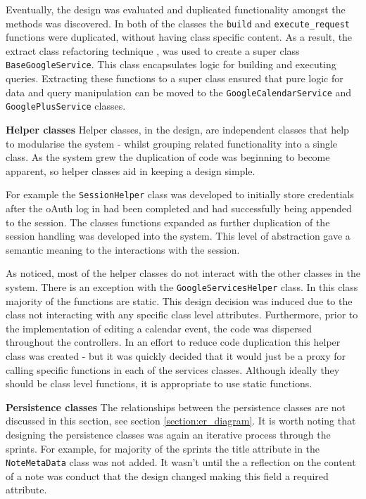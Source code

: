 Eventually, the design was evaluated and duplicated functionality amongst the methods was discovered. In both of the classes the \texttt{build} and \texttt{execute\_request} functions were duplicated, without having class specific content. As a result, the extract class refactoring technique \cite{citeulike:14023810}, was used to create a super class \texttt{BaseGoogleService}. This class encapsulates logic for building  and executing queries. Extracting these functions to a super class ensured that pure logic for data and query manipulation can be moved to the \texttt{GoogleCalendarService} and \texttt{GooglePlusService} classes.


\noindent
\textbf{Helper classes}
\newline
Helper classes, in the design, are independent classes that help to modularise the system - whilst grouping related functionality into a single class. As the system grew the duplication of code was beginning to become apparent, so helper classes aid in keeping a design simple.

For example the \texttt{SessionHelper} class was developed to initially store credentials after the oAuth log in had been completed and had successfully being appended to the session. The classes functions expanded as further duplication of the session handling was developed into the system.  This level of abstraction gave a semantic meaning to the interactions with the session.

As noticed, most of the helper classes do not interact with the other classes in the system. There is an exception with the \texttt{GoogleServicesHelper} class. In this class majority of the functions are static. This design decision was induced due to the class not interacting with any specific class level attributes. Furthermore, prior to the implementation of editing a calendar event, the code was dispersed throughout the controllers. In an effort to reduce code duplication this helper class was created - but it was quickly decided that it would just be a proxy for calling specific functions in each of the services classes. Although ideally they should be class level functions, it is appropriate to use static functions.

\noindent
\textbf{Persistence classes}
\newline
The relationships between the persistence classes are not discussed in this section, see section \ref{section:er_diagram}. It is worth noting that designing the persistence classes was again an iterative process through the sprints. For example, for majority of the sprints the title attribute in the \texttt{NoteMetaData} class was not added. It wasn't until the a reflection on the content of a note was conduct that the design changed making this field a required attribute.

